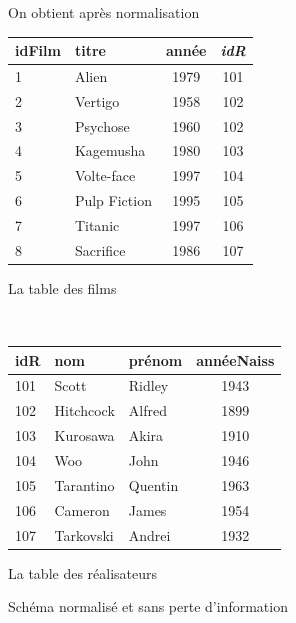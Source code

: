 \begin{frame}{On obtient après normalisation}


\begin{center}
\begin{minipage}[b]{6cm}
\begin{center}
\begin{tabular}{l|l|c|c}
\textbf{idFilm} & titre & année  & \textit{idR} \\
\hline
1 &Alien & 1979 & 101 \\
2 &Vertigo  & 1958 & 102\\
3 &Psychose & 1960 & 102 \\
4 &Kagemusha & 1980 & 103\\
5 &Volte-face & 1997 & 104 \\
6&Pulp Fiction & 1995 &  105 \\
7&Titanic & 1997 & 106 \\
8&Sacrifice & 1986 & 107\\
\hline
\end{tabular}

La table des films
\end{center}
\end{minipage} \ \hspace*{0.3cm}
\begin{minipage}[b]{5cm}
\begin{center}
\begin{tabular}{l|l|l|c}
{\bf idR} &  nom & prénom &  annéeNaiss \\
\hline
101 & Scott & Ridley & 1943\\
102 & Hitchcock & Alfred & 1899\\
103 & Kurosawa & Akira & 1910\\
104 & Woo & John & 1946\\
105 & Tarantino & Quentin & 1963 \\
106 & Cameron & James & 1954\\
107 & Tarkovski & Andrei &1932\\
\hline
\end{tabular}

La table des réalisateurs
\end{center}
\end{minipage}
\end{center}

\vfill

\begin{blocgauche}
\alert{Schéma normalisé et sans perte d'information}
\end{blocgauche}
\end{frame}


